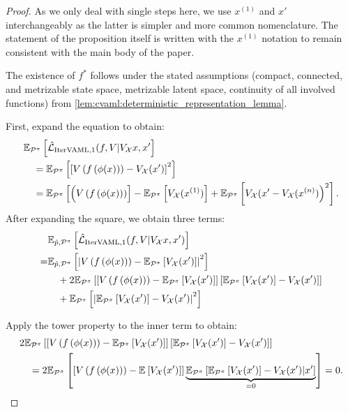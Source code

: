 \begin{proof}

As we only deal with single steps here, we use $x^{(1)}$ and $x'$ interchangeably as the latter is simpler and more common nomenclature.
The statement of the proposition itself is written with the $x^{(1)}$ notation to remain consistent with the main body of the paper.

The existence of $f^*$ follows under the stated assumptions (compact, connected, and metrizable state space, metrizable latent space, continuity of all involved functions) from \autoref{lem:cvaml:deterministic_representation_lemma}.

First, expand the equation to obtain:
\begin{align}
     &\mathbb{E}_{\mathcal{P}^\pi}\left[  \hat{\mathcal{L}}_{\text{IterVAML}, 1}(f, V | V_\mathcal{X} x, x'  \right] \\
    &\quad = \mathbb{E}_{\mathcal{P}^\pi}\left[  \left[ V\left( f\left( \phi(x) \right) \right) - V_\mathcal{X}(x') \right]^2 \right]\\
    &\quad = \mathbb{E}_{\mathcal{P}^\pi}\left[  \Bigl(V\left( f\left( \phi(x) \right) \right) \right] - \mathbb{E}_{\mathcal{P}^\pi}\left[  V_\mathcal{X}(x^{(1)}) \right] + \mathbb{E}_{\mathcal{P}^\pi}\left[  V_\mathcal{X}(x' - V_\mathcal{X}(x^{(n)}) \Bigr)^2 \right].
\end{align}
After expanding the square, we obtain three terms:
\begin{align}
    & \mathbb{E}_{\hat{p},\mathcal{P}^\pi}\left[  \hat{\mathcal{L}}_{\text{IterVAML}, 1}(f, V | V_\mathcal{X} x, x')  \right] \\
    = &\mathbb{E}_{\hat{p},\mathcal{P}^\pi}\left[  \left|{V\left( f\left( \phi(x) \right) \right) - \mathbb{E}_{\mathcal{P}^\pi}\left[  V_\mathcal{X}(x') \right]}\right|^2 \right] \\
    &\quad + 2 \mathbb{E}_{\mathcal{P}^\pi}\left[  \left[ V\left( f\left( \phi(x) \right) \right) - \mathbb{E}_{\mathcal{P}^\pi}\left[  V_\mathcal{X}(x') \right] \right]\left[ \mathbb{E}_{\mathcal{P}^\pi}\left[  V_\mathcal{X}(x') \right] - V_\mathcal{X}(x')  \right] \right]\\
    &\quad + \mathbb{E}_{\mathcal{P}^\pi}\left[  \left|{\mathbb{E}_{\mathcal{P}^\pi}\left[  V_\mathcal{X}(x') \right] - V_\mathcal{X}(x') }\right|^2 \right]
\end{align}

Apply the tower property to the inner term to obtain: 
\begin{align}
&2\mathbb{E}_{\mathcal{P}^\pi}\left[  \left[ V\left( f\left( \phi(x) \right) \right) - \mathbb{E}_{\mathcal{P}^\pi}\left[  V_\mathcal{X}(x') \right] \right]\left[ \mathbb{E}_{\mathcal{P}^\pi}\left[  V_\mathcal{X}(x') \right] - V_\mathcal{X}(x')  \right] \right]\\
&\quad =2\mathbb{E}_{\mathcal{P}^\pi}\left[  \left[ V\left( f\left( \phi(x) \right) \right) - \mathbb{E}_{}\left[  V_\mathcal{X}(x') \right] \right]\underbrace{\mathbb{E}_{\mathcal{P}^\pi}\left[  \mathbb{E}_{\mathcal{P}^\pi}\left[  V_\mathcal{X}(x') \right] - V_\mathcal{X}(x') \middle|x' \right]}_{=0} \right] = 0.
\end{align}


\end{proof}
